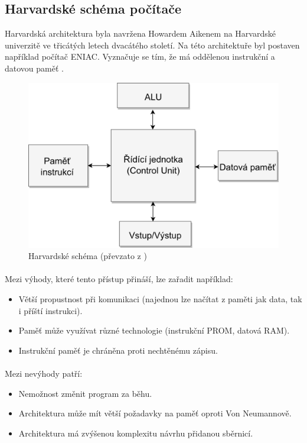 \documentclass[FM,BP]{tulthesis}
\begin{document}
\subsection{Harvardské schéma počítače} \label{kap:Harvardské schéma počítače}
Harvardská architektura byla navržena Howardem Aikenem na Harvardské univerzitě ve třicátých letech dvacátého století. Na této architektuře byl postaven například počítač ENIAC. Vyznačuje se tím, že má oddělenou instrukční a datovou paměť \cite{Kuty2014}. 

\begin{figure}[h]
    \includegraphics[scale=0.8]{assets/Harvard_Architecture.png}
    \centering
    \caption{Harvardské schéma (převzato z \cite{Schema_pc})}
    \label{img:Harvard}
\end{figure}

\paragraph{}
Mezi výhody, které tento přístup přináší, lze zařadit například:
\begin{itemize}
    \item Větší propustnost při komunikaci (najednou lze načítat z paměti jak data, tak i příští instrukci).
    \item Paměť může využívat různé technologie (instrukční PROM, datová RAM).
    \item Instrukční paměť je chráněna proti nechtěnému zápisu. 
\end{itemize}

\paragraph{}
Mezi nevýhody patří:
\begin{itemize}
    \item Nemožnost změnit program za běhu.
    \item Architektura může mít větší požadavky na paměť oproti Von Neumannově. 
    \item Architektura má zvýšenou komplexitu návrhu přidanou sběrnicí. \cite{gfg_harvard}
\end{itemize}
\end{document}

